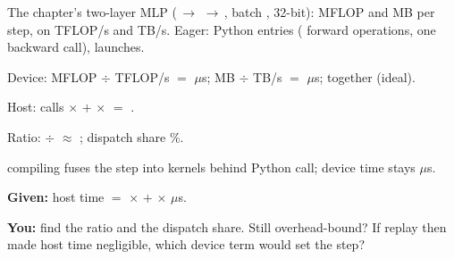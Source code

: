\documentclass{studysheet}
\begin{document}
\begin{leftcol}
\begin{practicebox}
The chapter's two-layer MLP ($\,\to\,$$\,\to\,$, batch , 32-bit):
 MFLOP and  MB per step, on  TFLOP/s and  TB/s. Eager:
 Python entries ( forward operations, one backward call),  launches.
\begin{steps}
\item Device:  MFLOP $\div$  TFLOP/s $=$  $\mu$s;  MB $\div$  TB/s
  $=$  $\mu$s; together  (ideal).
\item Host:  calls $\times$  $+$  $\times$  $=$ .
\item Ratio:  $\div$  $\approx$ ; dispatch share \%.
\end{steps}
\end{practicebox}

\vspace{12pt}
\begin{practicebox}
\assumed{} compiling fuses the step into  kernels behind  Python call;
device time stays  $\mu$s.\par\vspace{4pt}
\textbf{Given:} host time $=$  $\times$  $+$  $\times$  $\mu$s.\par
\textbf{You:} find the ratio and the dispatch share. Still overhead-bound? If replay then made host time
negligible, which device term would set the step?\par\vspace{50pt}
\end{practicebox}
\end{leftcol}%
\end{document}
